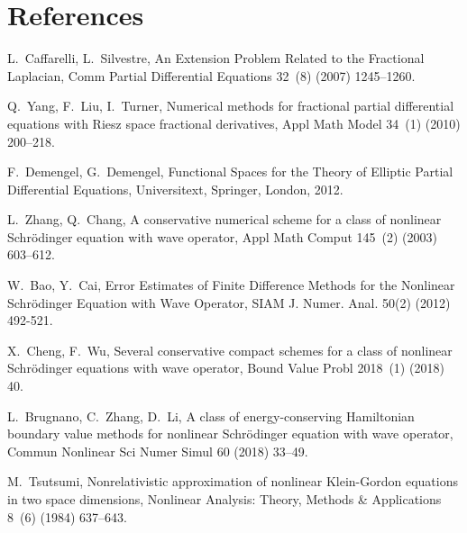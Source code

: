 \documentclass[preprint,compress,3p,10pt,fleqn]{elsarticle}
\numberwithin{equation}{section}
\begin{document}
\section*{References}
\begin{thebibliography}{10}
	
	L.~Caffarelli, L.~Silvestre, An Extension Problem Related to the Fractional Laplacian, Comm Partial
	  Differential Equations 32~(8) (2007) 1245--1260.
	
	Q.~Yang, F.~Liu, I.~Turner,  Numerical  methods for fractional partial differential equations with Riesz space
	  fractional derivatives, Appl Math Model 34~(1) (2010) 200--218.
	
	F.~Demengel, G.~Demengel, Functional Spaces for the Theory of Elliptic Partial Differential
	  Equations, Universitext, Springer, London, 2012.
	
	L.~Zhang, Q.~Chang, A conservative numerical scheme for a class of nonlinear Schr\"odinger
	  equation with wave operator, Appl Math Comput 145~(2) (2003) 603--612.
	
	  W.~Bao, Y.~Cai, Error Estimates of Finite Difference Methods for the Nonlinear
		Schr\"odinger Equation with Wave Operator, SIAM J. Numer. Anal. 50(2) (2012) 492-521.

	X.~Cheng, F.~Wu, Several conservative compact schemes for a class of nonlinear Schr\"odinger
	  equations with wave operator, Bound Value Probl 2018~(1) (2018) 40.
	
	L.~Brugnano, C.~Zhang, D.~Li, A class of energy-conserving Hamiltonian boundary value methods for nonlinear
	  Schr\"odinger equation with wave operator, Commun Nonlinear Sci Numer Simul 60 (2018) 33--49.
	
	M.~Tsutsumi, Nonrelativistic  approximation of nonlinear Klein-Gordon equations in two space
	  dimensions, Nonlinear Analysis: Theory, Methods \& Applications 8~(6) (1984) 637--643.
	

\end{thebibliography}
\end{document}
